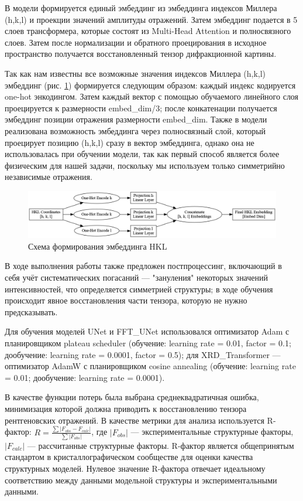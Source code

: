 В модели формируется единый эмбеддинг из эмбеддинга индексов Миллера (h,k,l) и проекции значений амплитуды отражений. Затем эмбеддинг подается в 5 слоев трансформера, которые состоят из Multi-Head Attention и полносвязного слоев. Затем после нормализации и обратного проецирования в исходное пространство получается восстановленный тензор дифракционной картины.

Так как нам известны все возможные значения индексов Миллера (h,k,l) эмбеддинг (рис. \ref{hklembed}) формируется следующим образом: каждый индекс кодируется one-hot энкодингом. Затем каждый вектор с помощью обучаемого линейного слоя проецируется к размерности embed\_dim/3; после конкатенации получается эмбеддинг позиции отражения размерности embed\_dim. Также в модели реализована возможность эмбеддинга через полносвязный слой, который проецирует позицию (h,k,l) сразу в вектор эмбеддинга, однако она не использовалась при обучении модели, так как первый способ является более физическим для нашей задачи, поскольку мы используем только симметрийно независимые отражения.


\begin{figure}[H]
    \centering
    \includegraphics[width=1\textwidth]{figures/hkl_embedding_process.png}
    \caption{Схема формирования эмбеддинга HKL}
    \label{hklembed}
\end{figure}

В ходе выполнения работы также предложен постпроцессинг, включающий в себя учёт систематических погасаний --- "зануления" некоторых значений интенсивностей, что определяется симметрией структуры; в ходе обучения происходит явное восстановления части тензора, которую не нужно предсказывать.

Для обучения моделей UNet и FFT\_UNet использовался оптимизатор Adam с планировщиком plateau scheduler (обучение: learning rate = 0.01, factor = 0.1; дообучение: learning rate = 0.0001, factor = 0.5); для XRD\_Transformer --- оптимизатор AdamW с планировщиком cosine annealing (обучение: learning rate = 0.01; дообучение: learning rate = 0.0001).

В качестве функции потерь была выбрана среднеквадратичная ошибка, минимизация которой должна приводить к восстановлению тензора рентгеновских отражений. В качестве метрики для анализа используется R-фактор: $R = \frac{\sum |F_{obs} - F_{calc}|}{\sum |F_{obs}|}$, где $|F_{obs}|$ --- экспериментальные структурные факторы, $|F_{calc}|$ --- рассчитанные структурные факторы. R-фактор является общепринятым стандартом в кристаллографическом сообществе для оценки качества структурных моделей. Нулевое значение R-фактора отвечает идеальному соответствию между данными модельной структуры и экспериментальными данными.

